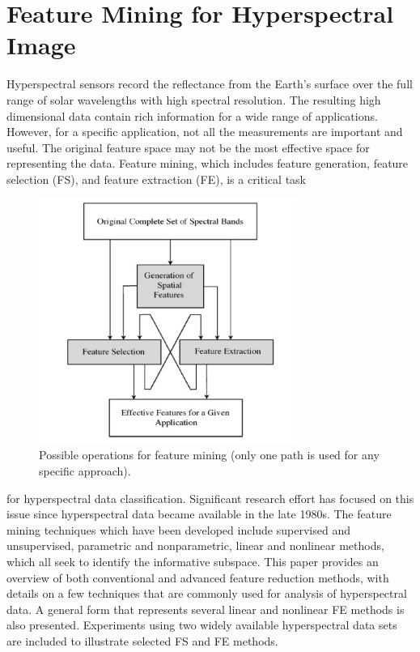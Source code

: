 \documentclass[document.tex]{subfiles}
\begin{document}
\section{Feature Mining for Hyperspectral Image}
\noindent Hyperspectral sensors record the reflectance from the Earth’s surface over the full range
of solar wavelengths with high spectral resolution. The resulting high dimensional data
contain rich information for a wide range of applications. However, for a specific application, not all the measurements are important and useful. The original feature space may
not be the most effective space for representing the data. Feature mining, which includes
feature generation, feature selection (FS), and feature extraction (FE), is a critical task
\begin{figure}[H]
	\begin{center}
		\includegraphics[height=8.0cm]{imgs/OperationFeatureMining.png}
	\end{center}
	\caption{Possible operations for feature mining (only one path is used for any specific
		approach).}
	\label{fig:Possible operations for feature mining (only one path is used for any specific
		approach).}
\end{figure}
for hyperspectral data classification. Significant research effort has focused on this issue since hyperspectral data became available in the late 1980s. The feature mining techniques which have been developed include supervised and unsupervised, parametric and
nonparametric, linear and nonlinear methods, which all seek to identify the informative
subspace. This paper provides an overview of both conventional and advanced feature
reduction methods, with details on a few techniques that are commonly used for analysis
of hyperspectral data. A general form that represents several linear and nonlinear FE
methods is also presented. Experiments using two widely available hyperspectral data
sets are included to illustrate selected FS and FE methods.
\end{document}
